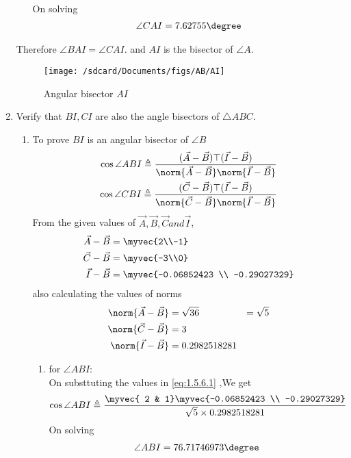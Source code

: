 \documentclass[11pt]{book}
\begin{document}
\begin{enumerate}[label=\thesection.\arabic*.,ref=\thesection.\theenumi]
\begin{enumerate}
\begin{align}
    \end{align}
    On solving 
    \begin{align}
        \angle CAI = 7.62755\degree
    \end{align}
\end{enumerate}
Therefore $\angle BAI = \angle CAI.$ and $AI$ is the bisector of $\angle A$. 
\begin{figure}[H]
\texttt{[image: /sdcard/Documents/figs/AB/AI]}
\caption{Angular bisector $AI$}
\label{fig:fig4}
\end{figure}

\item Verify that $BI, CI$ are also the angle bisectors of $\triangle ABC$. \\
\solution
\begin{enumerate}
    \item To prove $BI$ is an angular bisector of $ \angle B$
\begin{align}
\label{eq:1.5.6.1}
\cos{\angle ABI} \triangleq \frac{(\vec{A}-\vec{B})\top(\vec{I}-\vec{B})}{\norm{\vec{A}-\vec{B}}\norm{\vec{I}-\vec{B}}} \\
\cos{\angle CBI} \triangleq \frac{(\vec{C}-\vec{B})\top(\vec{I}-\vec{B})}{\norm{\vec{C}-\vec{B}}\norm{\vec{I}-\vec{B}}} 
\end{align}
From the given values of $\vec{A},\vec{B},\vec{C} and \vec{I}$,\\
\begin{align}
	\vec{A}-\vec{B} &=\myvec{2\\-1} \\
	\vec{C}-\vec{B}&= \myvec{-3\\0} \\
 \vec{I}-\vec{B}  &=\myvec{-0.06852423 \\ -0.29027329}
\end{align}
also calculating the values of norms
\begin{align}
	\norm{\vec{A}-\vec{B}} &= \sqrt{36} &= \sqrt{5}\\
	\norm{\vec{C}-\vec{B}} &= 3 \\
 	\norm{\vec{I}-\vec{B}} &= 0.2982518281 \\
\end{align}


\begin{enumerate}
    \item for $\angle ABI$: \\
    On substtuting the values in  \eqref{eq:1.5.6.1} ,We get 
    \begin{align}
        \cos{\angle ABI} \triangleq \frac{\myvec{ 2 & 1}\myvec{-0.06852423 \\ -0.29027329}}{ \sqrt{5}\times 0.2982518281} \\
    \end{align}
    On solving 
    \begin{align}
        \angle ABI = 76.71746973\degree
    \end{align}
    

\end{enumerate}
\end{enumerate}
\end{enumerate}
\end{document}
